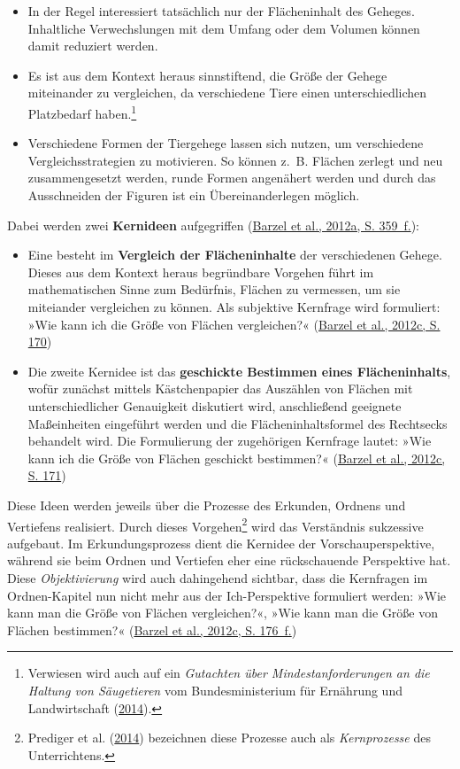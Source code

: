 \documentclass[
]{scrbook}
\providecommand{\tightlist}{%
  \setlength{\itemsep}{0pt}\setlength{\parskip}{0pt}}
\theoremstyle{definition}
\theoremstyle{definition}
\theoremstyle{definition}
\theoremstyle{definition}
\theoremstyle{remark}
\begin{document}
\begin{itemize}
\tightlist
\item
  In der Regel interessiert tatsächlich nur der Flächeninhalt des Geheges. Inhaltliche Verwechslungen mit dem Umfang oder dem Volumen können damit reduziert werden.
\item
  Es ist aus dem Kontext heraus sinnstiftend, die Größe der Gehege miteinander zu vergleichen, da verschiedene Tiere einen unterschiedlichen Platzbedarf haben.\footnote{Verwiesen wird auch auf ein \emph{Gutachten über Mindestanforderungen an die Haltung von Säugetieren} vom Bundesministerium für Ernährung und Landwirtschaft (\protect\hyperlink{ref-BundesministeriumfurErnahrungundLandwirtschaft2014}{2014}).}
\item
  Verschiedene Formen der Tiergehege lassen sich nutzen, um verschiedene Vergleichsstrategien zu motivieren. So können z.~B. Flächen zerlegt und neu zusammengesetzt werden, runde Formen angenähert werden und durch das Ausschneiden der Figuren ist ein Übereinanderlegen möglich.
\end{itemize}

Dabei werden zwei \textbf{Kernideen} aufgegriffen (\protect\hyperlink{ref-Barzel2012a}{Barzel et al., 2012a, S. 359~f.}):

\begin{itemize}
\tightlist
\item
  Eine besteht im \textbf{Vergleich der Flächeninhalte} der verschiedenen Gehege. Dieses aus dem Kontext heraus begründbare Vorgehen führt im mathematischen Sinne zum Bedürfnis, Flächen zu vermessen, um sie miteiander vergleichen zu können. Als subjektive Kernfrage wird formuliert: »Wie kann ich die Größe von Flächen vergleichen?« (\protect\hyperlink{ref-Barzel2012}{Barzel et al., 2012c, S. 170})
\item
  Die zweite Kernidee ist das \textbf{geschickte Bestimmen eines Flächeninhalts}, wofür zunächst mittels Kästchenpapier das Auszählen von Flächen mit unterschiedlicher Genauigkeit diskutiert wird, anschließend geeignete Maßeinheiten eingeführt werden und die Flächeninhaltsformel des Rechtsecks behandelt wird. Die Formulierung der zugehörigen Kernfrage lautet: »Wie kann ich die Größe von Flächen geschickt bestimmen?« (\protect\hyperlink{ref-Barzel2012}{Barzel et al., 2012c, S. 171})
\end{itemize}

Diese Ideen werden jeweils über die Prozesse des Erkunden, Ordnens und Vertiefens realisiert. Durch dieses Vorgehen\footnote{Prediger et al. (\protect\hyperlink{ref-Prediger2014}{2014}) bezeichnen diese Prozesse auch als \emph{Kernprozesse} des Unterrichtens.} wird das Verständnis sukzessive aufgebaut. Im Erkundungsprozess dient die Kernidee der Vorschauperspektive, während sie beim Ordnen und Vertiefen eher eine rückschauende Perspektive hat. Diese \emph{Objektivierung} wird auch dahingehend sichtbar, dass die Kernfragen im Ordnen-Kapitel nun nicht mehr aus der Ich-Perspektive formuliert werden: »Wie kann man die Größe von Flächen vergleichen?«, »Wie kann man die Größe von Flächen bestimmen?« (\protect\hyperlink{ref-Barzel2012}{Barzel et al., 2012c, S. 176~f.})
\end{document}
